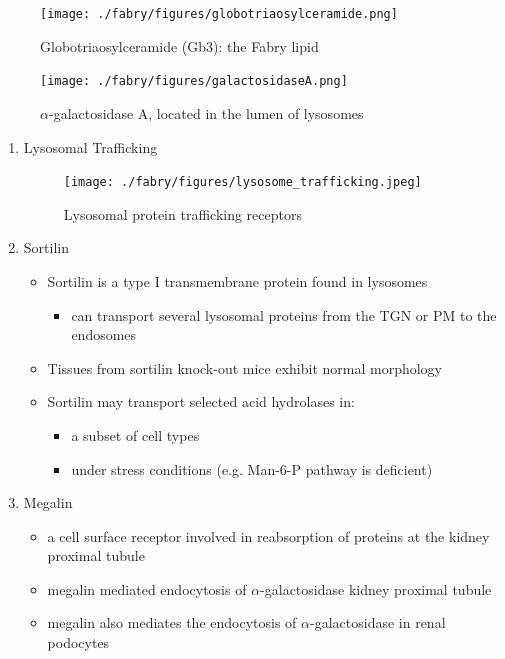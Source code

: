 \documentclass{scrartcl}
\begin{document}
\begin{enumerate}
\begin{figure}[htbp]
\centering
\texttt{[image: ./fabry/figures/globotriaosylceramide.png]}
\caption[Globotriaosylceramide]{\label{fig:orgcbb53c2}
Globotriaosylceramide (Gb3): the Fabry lipid}
\end{figure}

\begin{figure}[htbp]
\centering
\texttt{[image: ./fabry/figures/galactosidaseA.png]}
\caption[\(\alpha\)-galactosidase A]{\label{fig:orgd418188}
\(\alpha\)-galactosidase A, located in the lumen of lysosomes}
\end{figure}


\begin{enumerate}
\item Lysosomal Trafficking
\label{sec:org54a2b09}

\begin{figure}[htbp]
\centering
\texttt{[image: ./fabry/figures/lysosome\_trafficking.jpeg]}
\caption[Lysosomal protein trafficking receptors]{\label{fig:orgd295696}
Lysosomal protein trafficking receptors}
\end{figure}


\item Sortilin
\label{sec:orgb5ffd84}

\begin{itemize}
\item Sortilin is a type I transmembrane protein found in lysosomes
\begin{itemize}
\item can transport several lysosomal proteins from the TGN or PM to the endosomes
\end{itemize}
\item Tissues from sortilin knock-out mice exhibit normal morphology
\item Sortilin may transport selected acid hydrolases in:
\begin{itemize}
\item a subset of cell types
\item under stress conditions (e.g. Man-6-P pathway is deficient)
\end{itemize}
\end{itemize}

\item Megalin
\label{sec:orgfa12a70}
\begin{itemize}
\item a cell surface receptor involved in reabsorption of proteins at the kidney proximal tubule
\item megalin mediated endocytosis of \(\alpha\)-galactosidase kidney proximal tubule
\item megalin also mediates the endocytosis of \(\alpha\)-galactosidase in renal podocytes
\end{itemize}
\end{enumerate}


\end{enumerate}
\end{document}
